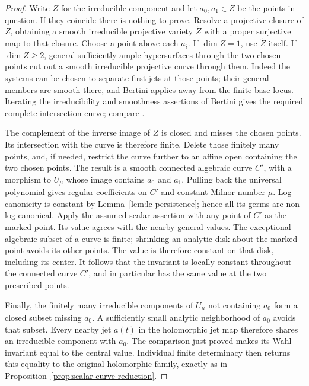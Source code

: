 \begin{proof}
Write $Z$ for the irreducible component and let $a_0,a_1\in Z$ be
the points in question.  If they coincide there is nothing to prove.
Resolve a projective closure of $Z$, obtaining a smooth irreducible
projective variety $\widetilde Z$ with a proper surjective map to
that closure.  Choose a point above each $a_i$.  If $\dim Z=1$,
use $\widetilde Z$ itself.  If $\dim Z\ge2$, general sufficiently
ample hypersurfaces through the two chosen points cut out a smooth
irreducible projective curve through them.  Indeed the systems can
be chosen to separate first jets at those points; their general
members are smooth there, and Bertini applies away from the finite
base locus.  Iterating the irreducibility and smoothness assertions
of Bertini gives the required complete-intersection curve; compare
\cite{KleimanBertini}.

The complement of the inverse image of $Z$ is closed and misses the
chosen points.  Its intersection with the curve is therefore
finite.  Delete those finitely many points, and, if needed, restrict
the curve further to an affine open containing the two chosen
points.  The result is a smooth connected algebraic curve $C'$,
with a morphism to $U_\mu$ whose image contains $a_0$ and $a_1$.
Pulling back the universal polynomial gives regular coefficients
on $C'$ and constant Milnor number $\mu$.  Log canonicity is
constant by Lemma~\ref{lem:lc-persistence}; hence all its germs are
non-log-canonical.  Apply the assumed scalar assertion with any
point of $C'$ as the marked point.  Its value agrees with the
nearby general values.  The exceptional algebraic subset of a
curve is finite; shrinking an analytic disk about the marked
point avoids its other points.  The value is therefore constant
on that disk, including its center.  It follows that the invariant
is locally constant throughout the connected curve $C'$, and in
particular has the same value at the two prescribed points.

Finally, the finitely many irreducible components of $U_\mu$ not
containing $a_0$ form a closed subset missing $a_0$.  A sufficiently
small analytic neighborhood of $a_0$ avoids that subset.  Every
nearby jet $a(t)$ in the holomorphic jet map therefore shares an
irreducible component with $a_0$.  The comparison just proved makes
its Wahl invariant equal to the central value.  Individual finite
determinacy then returns this equality to the original holomorphic
family, exactly as in Proposition~\ref{prop:scalar-curve-reduction}.
\end{proof}
